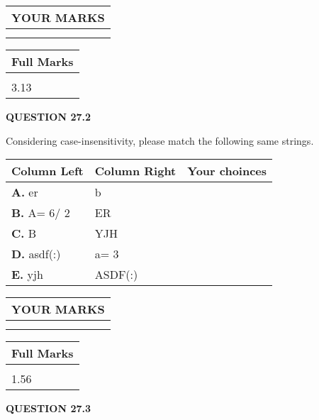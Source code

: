 \documentclass[12pt]{article}
\begin{document}
   
  
\vspace{0.2in}
  
\noindent\begin{tabular}{|l|}
\hline
 YOUR MARKS  \\
\hline
 \\ 
 \\ 
\hline
\end{tabular}
\hspace{0.05in} \begin{tabular}{|l|}
\hline
 Full Marks  \\
\hline
 \\ 
3.13 \\
\hline
\end{tabular}
{\textbf{\Large{QUESTION
27.2 
}}}
  
  
Considering case-insensitivity, please match the following same strings.
  
  
\begin{tabular}{|l|l|l|}
 \hline
 Column Left & Column Right  & Your choinces \\ 
 \hline
{\textbf{\large{
A.}}}
er
  & 
b
 & 
 \\ 
 \hline
{\textbf{\large{
B.}}}
 A= %
6/ %
2

  & 
ER
 & 
 \\ 
 \hline
{\textbf{\large{
C.}}}
B
  & 
YJH
 & 
 \\ 
 \hline
{\textbf{\large{
D.}}}
asdf(:)
  & 
 a= %
3
 & 
 \\ 
 \hline
{\textbf{\large{
E.}}}
yjh
  & 
ASDF(:)
 & 
 \\ 
 \hline
 \end{tabular}
  
  
 
  
\vspace{0.2in}
  
\noindent\begin{tabular}{|l|}
\hline
 YOUR MARKS  \\
\hline
 \\ 
 \\ 
\hline
\end{tabular}
\hspace{0.05in} \begin{tabular}{|l|}
\hline
 Full Marks  \\
\hline
 \\ 
1.56 \\
\hline
\end{tabular}
{\textbf{\Large{QUESTION
27.3 
}}}
  
\end{document}
